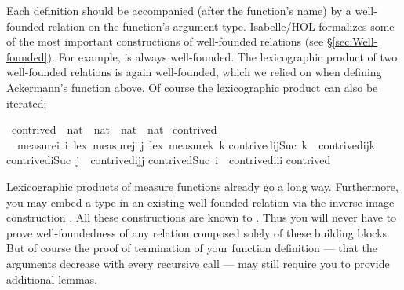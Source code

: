 \begin{isabellebody}
\begin{isamarkuptext}
Each  definition should be accompanied (after the function's
name) by a well-founded relation on the function's argument type.  
Isabelle/HOL formalizes some of the most important
constructions of well-founded relations (see \S\ref{sec:Well-founded}). For
example,  is always well-founded.   The lexicographic
product of two well-founded relations is again well-founded, which we relied
on when defining Ackermann's function above.
Of course the lexicographic product can also be iterated:%
\end{isamarkuptext}%
\isamarkuptrue%
\ contrived\ {\isacharcolon}{\isacharcolon}\ {\isachardoublequote}nat\ {\isasymtimes}\ nat\ {\isasymtimes}\ nat\ {\isasymRightarrow}\ nat{\isachardoublequote}\isanewline
\isamarkupfalse%
\ contrived\isanewline
\ \ {\isachardoublequote}measure{\isacharparenleft}{\isasymlambda}i{\isachardot}\ i{\isacharparenright}\ {\isacharless}{\isacharasterisk}lex{\isacharasterisk}{\isachargreater}\ measure{\isacharparenleft}{\isasymlambda}j{\isachardot}\ j{\isacharparenright}\ {\isacharless}{\isacharasterisk}lex{\isacharasterisk}{\isachargreater}\ measure{\isacharparenleft}{\isasymlambda}k{\isachardot}\ k{\isacharparenright}{\isachardoublequote}\isanewline
{\isachardoublequote}contrived{\isacharparenleft}i{\isacharcomma}j{\isacharcomma}Suc\ k{\isacharparenright}\ {\isacharequal}\ contrived{\isacharparenleft}i{\isacharcomma}j{\isacharcomma}k{\isacharparenright}{\isachardoublequote}\isanewline
{\isachardoublequote}contrived{\isacharparenleft}i{\isacharcomma}Suc\ j{\isacharcomma}{}{\isacharparenright}\ {\isacharequal}\ contrived{\isacharparenleft}i{\isacharcomma}j{\isacharcomma}j{\isacharparenright}{\isachardoublequote}\isanewline
{\isachardoublequote}contrived{\isacharparenleft}Suc\ i{\isacharcomma}{}{\isacharcomma}{}{\isacharparenright}\ {\isacharequal}\ contrived{\isacharparenleft}i{\isacharcomma}i{\isacharcomma}i{\isacharparenright}{\isachardoublequote}\isanewline
{\isachardoublequote}contrived{\isacharparenleft}{}{\isacharcomma}{}{\isacharcomma}{}{\isacharparenright}\ \ \ \ \ {\isacharequal}\ {}{\isachardoublequote}\isamarkupfalse%
%
\begin{isamarkuptext}%
Lexicographic products of measure functions already go a long
way. Furthermore, you may embed a type in an
existing well-founded relation via the inverse image construction . All these constructions are known to . Thus you
will never have to prove well-foundedness of any relation composed
solely of these building blocks. But of course the proof of
termination of your function definition --- that the arguments
decrease with every recursive call --- may still require you to provide
additional lemmas.


\end{isamarkuptext}
\end{isabellebody}
